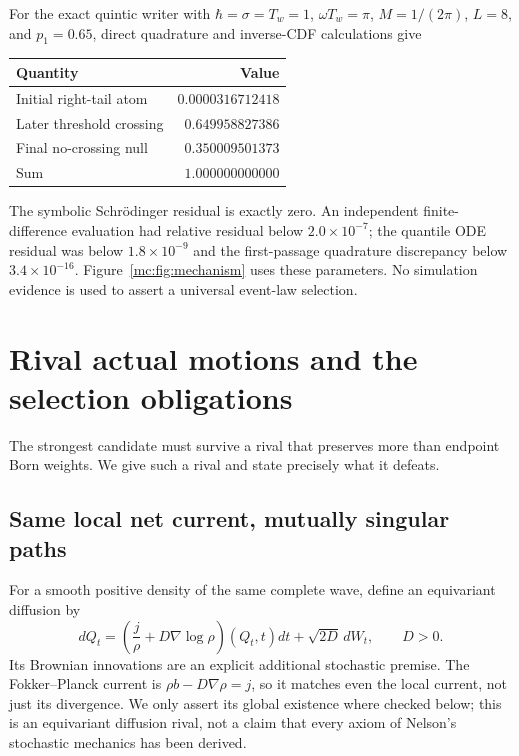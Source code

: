 \documentclass[11pt,oneside,openany]{book}
\theoremstyle{definition}
\theoremstyle{remark}\newtheorem{remark}[theorem]{Remark}
\begin{document}
For the exact quintic writer with $\hbar=\sigma=T_w=1$, $\omega T_w=\pi$, $M=1/(2\pi)$, $L=8$, and $p_1=0.65$, direct quadrature and inverse-CDF calculations give
\begin{center}
\begin{tabular}{@{}lr@{}}\toprule
Quantity & Value\\\midrule
Initial right-tail atom & $0.0000316712418$\\
Later threshold crossing & $0.649958827386$\\
Final no-crossing null & $0.350009501373$\\
Sum & $1.000000000000$\\\bottomrule
\end{tabular}
\end{center}
The symbolic Schr\"odinger residual is exactly zero. An independent finite-difference evaluation had relative residual below $2.0\times10^{-7}$; the quantile ODE residual was below $1.8\times10^{-9}$ and the first-passage quadrature discrepancy below $3.4\times10^{-16}$. Figure~\ref{mc:fig:mechanism} uses these parameters. No simulation evidence is used to assert a universal event-law selection.

\section{Rival actual motions and the selection obligations}
\label{mc:sec:rivals}
The strongest candidate must survive a rival that preserves more than endpoint Born weights. We give such a rival and state precisely what it defeats.

\subsection{Same local net current, mutually singular paths}
For a smooth positive density of the same complete wave, define an equivariant diffusion by
\begin{equation}\label{mc:eq:diffusion}
 dQ_t=\left(\frac j\rho+D\nabla\log\rho\right)(Q_t,t)dt
                                   +\sqrt{2D}\,dW_t,
 \qquad D>0.
\end{equation}
Its Brownian innovations are an explicit additional stochastic premise. The Fokker--Planck current is $\rho b-D\nabla\rho=j$, so it matches even the local current, not just its divergence. We only assert its global existence where checked below; this is an equivariant diffusion rival, not a claim that every axiom of Nelson's stochastic mechanics has been derived.
\end{document}
